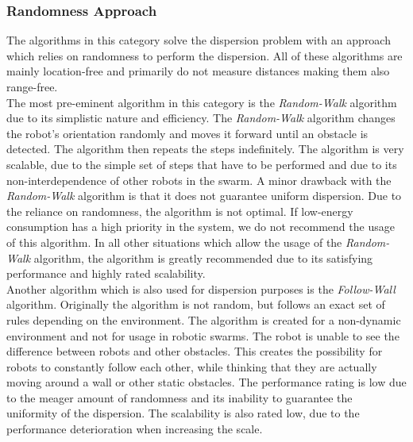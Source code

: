 \subsubsection{Randomness Approach}
The algorithms in this category solve the dispersion problem with an approach which relies on randomness to perform the dispersion.
All of these algorithms are mainly location-free and primarily do not measure distances making them also range-free.\\
The most pre-eminent algorithm in this category is the \emph{Random-Walk} algorithm due to its simplistic nature and efficiency. \cite{morlok2007dispersing}
The \emph{Random-Walk} algorithm changes the robot's orientation randomly and moves it forward until an obstacle is detected. 
The algorithm then repeats the steps indefinitely.
The algorithm is very scalable, due to the simple set of steps that have to be performed and due to its non-interdependence of other robots in the swarm.
A minor drawback with the \emph{Random-Walk} algorithm is that it does not guarantee uniform dispersion.
Due to the reliance on randomness, the algorithm is not optimal. 
If low-energy consumption has a high priority in the system, we do not recommend the usage of this algorithm.
In all other situations which allow the usage of the \emph{Random-Walk} algorithm, the algorithm is greatly recommended due to its satisfying performance and highly rated scalability.\\
Another algorithm which is also used for dispersion purposes is the \emph{Follow-Wall} algorithm. \cite{morlok2007dispersing}
Originally the algorithm is not random, but follows an exact set of rules depending on the environment. 
The algorithm is created for a non-dynamic environment and not for usage in robotic swarms.
The robot is unable to see the difference between robots and other obstacles. This creates the possibility for robots to constantly follow each other, while thinking that they are actually moving around a wall or other static obstacles.
The performance rating is low due to the meager amount of randomness and its inability to guarantee the uniformity of the dispersion. 
The scalability is also rated low, due to the performance deterioration when increasing the scale.

